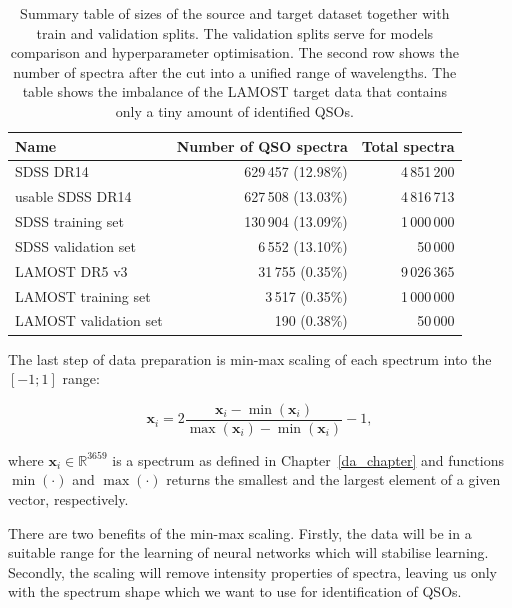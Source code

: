 \begin{table}
\begin{center}
\begin{tabular}{|l|r|r|}
	\hline
	Name & Number of QSO spectra & Total spectra \\ \hline \hline
	SDSS DR14 & 629\,457 (12.98\%) & 4\,851\,200 \\ \hline
	usable SDSS DR14 & 627\,508 (13.03\%) & 4\,816\,713 \\ \hline
	SDSS training set & 130\,904 (13.09\%) & 1\,000\,000 \\ \hline
	SDSS validation set & 6\,552 (13.10\%) & 50\,000 \\ \hline
	LAMOST DR5 v3 & 31\,755 (0.35\%) & 9\,026\,365 \\ \hline
	LAMOST training set & 3\,517 (0.35\%) & 1\,000\,000 \\ \hline
	LAMOST validation set & 190 (0.38\%) & 50\,000 \\ \hline
\end{tabular}
\end{center}
\caption[Sizes of source and target datasets]{
	Summary table of sizes of the source and target dataset
	together with train and validation splits.
	The validation splits serve for models comparison
	and hyperparameter optimisation.
	The second row shows the number of spectra
	after the cut into a unified range of wavelengths.
	The table shows the imbalance of the LAMOST target data
	that contains only a tiny amount of identified QSOs.
	}
\label{datasets_sizes}
\end{table}

The last step of data preparation is min-max scaling of each spectrum into the \([-1; 1]\) range:

\begin{equation}
	\mathbf{x}_i = 2 \frac{\mathbf{x}_i - \min(\mathbf{x}_i)}{
		\max(\mathbf{x}_i) - \min(\mathbf{x}_i)} - 1,
\end{equation}

where \(\mathbf{x}_i \in \mathbb{R}^{3659}\) is a spectrum as defined in Chapter~\ref{da_chapter}
and functions \(\min(\cdot)\) and \(\max(\cdot)\) returns the smallest and the largest element of a given vector, respectively.

There are two benefits of the min-max scaling.
Firstly, the data will be in a suitable range for the learning of neural networks
which will stabilise learning.
Secondly, the scaling will remove intensity properties of spectra,
leaving us only with the spectrum shape
which we want to use for identification of QSOs.

